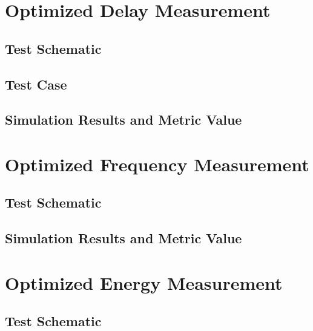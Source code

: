 \documentclass[12pt]{article}
\begin{document}
\newpage

\section{Optimized Delay Measurement}
\subsection{Test Schematic}



\newpage

\subsection{Test Case}



\newpage

\subsection{Simulation Results and Metric Value}



\newpage

\section{Optimized Frequency Measurement}
\subsection{Test Schematic}



\newpage

\subsection{Simulation Results and Metric Value}



\newpage

\section{Optimized Energy Measurement}
\subsection{Test Schematic}
\end{document}
